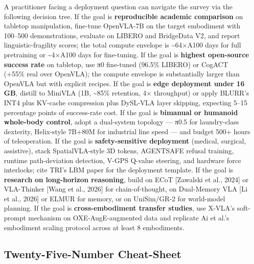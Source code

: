 A practitioner facing a deployment question can navigate the survey via the following decision tree. If the goal is \textbf{reproducible academic comparison} on tabletop manipulation, fine-tune OpenVLA-7B on the target embodiment with 100--500 demonstrations, evaluate on LIBERO and BridgeData V2, and report linguistic-fragility scores; the total compute envelope is \textasciitilde64×A100 days for full pretraining or \textasciitilde4×A100 days for fine-tuning. If the goal is \textbf{highest open-source success rate} on tabletop, use π0 fine-tuned (96.5\% LIBERO) or CogACT (+55\% real over OpenVLA); the compute envelope is substantially larger than OpenVLA but with explicit recipes. If the goal is \textbf{edge deployment under 16 GB}, distill to MiniVLA (1B, \textasciitilde85\% retention, 4× throughput) or apply BLURR's INT4 plus KV-cache compression plus DySL-VLA layer skipping, expecting 5--15 percentage points of success-rate cost. If the goal is \textbf{bimanual or humanoid whole-body control}, adopt a dual-system topology --- π0.5 for laundry-class dexterity, Helix-style 7B+80M for industrial line speed --- and budget 500+ hours of teleoperation. If the goal is \textbf{safety-sensitive deployment} (medical, surgical, assistive), stack SpatialVLA-style 3D tokens, AGENTSAFE refusal training, runtime path-deviation detection, V-GPS Q-value steering, and hardware force interlocks; cite TRI's LBM paper for the deployment template. If the goal is \textbf{research on long-horizon reasoning}, build on ECoT {[}Zawalski et al., 2024{]} or VLA-Thinker {[}Wang et al., 2026{]} for chain-of-thought, on Dual-Memory VLA {[}Li et al., 2026{]} or ELMUR for memory, or on UniSim/GR-2 for world-model planning. If the goal is \textbf{cross-embodiment transfer studies}, use X-VLA's soft-prompt mechanism on OXE-AugE-augmented data and replicate Ai et al.'s embodiment scaling protocol across at least 8 embodiments.

\subsection{Twenty-Five-Number Cheat-Sheet}\label{twenty-five-number-cheat-sheet}

